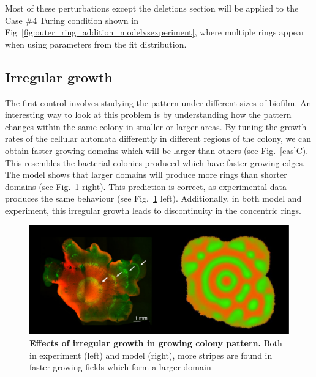 Most of these perturbations except the deletions section will be applied to the Case \#4 Turing condition shown in Fig~\ref{fig:outer_ring_addition_modelvsexperiment}, where multiple rings appear when using parameters from the fit distribution.

\subsection{Irregular growth}
The first control involves studying the pattern under different sizes of biofilm.
An interesting way to look at this problem is by understanding how the pattern changes within the same colony in smaller or larger areas.
By tuning the growth rates of the cellular automata differently in different regions of the colony, we can obtain faster growing domains which will be larger than others (see Fig.~\ref{cas}C).
This resembles the bacterial colonies produced which have faster growing edges.
The model shows that larger domains will produce more rings than shorter domains (see Fig.~\ref{fig:irregular growth} right).
This prediction is correct, as experimental data produces the same behaviour  (see Fig.~\ref{fig:irregular growth} left).
Additionally, in both model and experiment, this irregular growth leads to discontinuity in the concentric rings.
\begin{figure}[H] %
    \centering
    \begin{adjustbox}{center}
        \includegraphics[width=1\textwidth]{chapters/Chapter 3/irregular growth} %
    \end{adjustbox}
    \caption{\textbf{Effects of irregular growth in growing colony pattern.} Both in experiment (left) and model (right), more stripes are found in faster growing fields which form a larger domain}
    \label{fig:irregular growth}
\end{figure}


